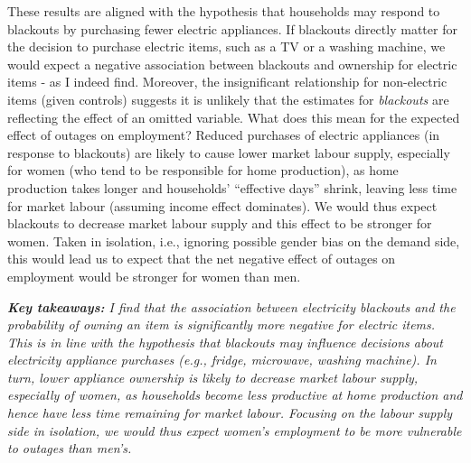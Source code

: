 \documentclass[12pt]{article}
\begin{document}
These results are aligned with the hypothesis that households may respond to blackouts by purchasing fewer electric appliances. If blackouts directly matter for the decision to purchase electric items, such as a TV or a washing machine, we would expect a negative association between blackouts and ownership for electric items - as I indeed find. Moreover, the insignificant relationship for non-electric items (given controls) suggests it is unlikely that the estimates for \textit{blackouts} are reflecting the effect of an omitted variable. What does this mean for the expected effect of outages on employment? Reduced purchases of electric appliances (in response to blackouts) are likely to cause lower market labour supply, especially for women (who tend to be responsible for home production), as home production takes longer and households' “effective days” shrink, leaving less time for market labour (assuming income effect dominates). We would thus expect blackouts to decrease market labour supply and this effect to be stronger for women. Taken in isolation, i.e., ignoring possible gender bias on the demand side, this would lead us to expect that the net negative effect of outages on employment would be stronger for women than men. 
\par \noindent
\textit{\textbf{Key takeaways:} I find that the association between electricity blackouts and the probability of owning an item is significantly more negative for electric items. This is in line with the hypothesis that blackouts may influence decisions about electricity appliance purchases (e.g., fridge, microwave, washing machine). In turn, lower appliance ownership is likely to decrease market labour supply, especially of women, as households become less productive at home production and hence have less time remaining for market labour. Focusing on the labour supply side in isolation, we would thus expect women's employment to be more vulnerable to outages than men's.}
\par
\end{document}

